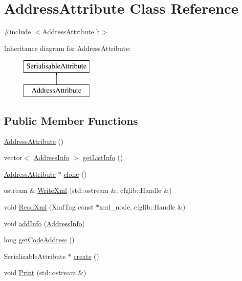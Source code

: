\hypertarget{classAddressAttribute}{}\section{Address\+Attribute Class Reference}
\label{classAddressAttribute}


{\ttfamily \#include $<$Address\+Attribute.\+h$>$}

Inheritance diagram for Address\+Attribute\+:\begin{figure}[H]
\begin{center}
\leavevmode
\includegraphics[height=2.000000cm]{classAddressAttribute}
\end{center}
\end{figure}
\subsection*{Public Member Functions}
\begin{DoxyCompactItemize}
\item 
\hyperlink{classAddressAttribute_ace33470ed7a894142633a223b64378af}{Address\+Attribute} ()
\item 
vector$<$ \hyperlink{classAddressInfo}{Address\+Info} $>$ \hyperlink{classAddressAttribute_ac7c1a2d8160f4db5423fd53dc305f886}{get\+List\+Info} ()
\item 
\hyperlink{classAddressAttribute}{Address\+Attribute} $\ast$ \hyperlink{classAddressAttribute_ab418a5c40c38661892b790274dac50a0}{clone} ()
\item 
ostream \& \hyperlink{classAddressAttribute_ad189a02a8d2bc9058cd35bebf3f1210f}{Write\+Xml} (std\+::ostream \&, cfglib\+::\+Handle \&)
\item 
void \hyperlink{classAddressAttribute_a08871197b24a886864a337896ebab051}{Read\+Xml} (Xml\+Tag const $\ast$xml\+\_\+node, cfglib\+::\+Handle \&)
\item 
void \hyperlink{classAddressAttribute_aaa60489ef43cad77278ef19325dcd18c}{add\+Info} (\hyperlink{classAddressInfo}{Address\+Info})
\item 
long \hyperlink{classAddressAttribute_afebe2c5206d6e06ff5e479433a299ffa}{get\+Code\+Address} ()
\item 
Serialisable\+Attribute $\ast$ \hyperlink{classAddressAttribute_a25b4e25c9284dcdea23b761ca519dcd8}{create} ()
\item 
void \hyperlink{classAddressAttribute_a862ec35a0100f0486d466eac3cdb1cc3}{Print} (std\+::ostream \&)
\end{DoxyCompactItemize}


